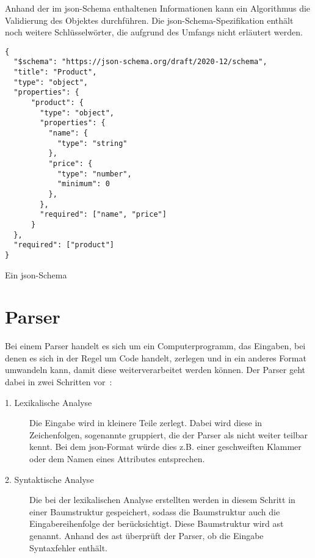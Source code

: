 Anhand der im \acs{json}-Schema enthaltenen Informationen kann ein Algorithmus die Validierung des Objektes durchführen.
Die \acs{json}-Schema-Spezifikation enthält noch weitere Schlüsselwörter, die aufgrund des Umfangs nicht erläutert werden.

\begin{listing}[htp]
      \begin{verbatim}
{
  "$schema": "https://json-schema.org/draft/2020-12/schema",
  "title": "Product",
  "type": "object",
  "properties": {
      "product": {
        "type": "object",
        "properties": {
          "name": {
            "type": "string"
          },
          "price": {
            "type": "number", 
            "minimum": 0
          },
        },
        "required": ["name", "price"]
      }
  },
  "required": ["product"]
}
      \end{verbatim}
      \caption{Ein \acs{json}-Schema}
      \label{lst:json-schema}
\end{listing}

\section{Parser}\label{sec:parser}

Bei einem Parser handelt es sich um ein Computerprogramm, das Eingaben, bei denen es sich in der Regel um Code handelt,
zerlegen und in ein anderes Format umwandeln kann, damit
diese weiterverarbeitet werden können. Der Parser geht dabei in zwei Schritten vor~\cite{parser-tech-target}:

\begin{description}
      \item[1. Lexikalische Analyse]
            Die Eingabe wird in kleinere Teile zerlegt. Dabei wird diese in Zeichenfolgen, sogenannte 
            gruppiert, die der Parser als nicht weiter teilbar kennt. Bei dem \ac{json}-Format würde dies z.B. einer geschweiften Klammer oder
            dem Namen eines Attributes entsprechen.
      \item[2. Syntaktische Analyse]
            Die bei der lexikalischen Analyse erstellten  werden in diesem Schritt in einer Baumstruktur gespeichert, sodass die
            Baumstruktur auch die Eingabereihenfolge der  berücksichtigt. Diese Baumstruktur wird \ac{ast} genannt.
            Anhand des \ac{ast} überprüft der Parser, ob die Eingabe Syntaxfehler enthält.
\end{description}
